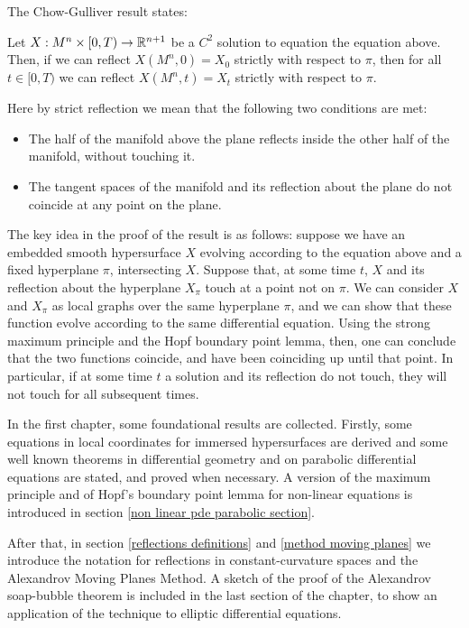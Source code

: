 The Chow-Gulliver result states:

\begin{theorem*}
	Let $X:M^n\times [0,T) \rightarrow \mathbb{R}^{n+1}$ be a $C^2$ solution to equation the equation above. Then, if we can reflect $X(M^n, 0)=X_0$ strictly with respect to $\pi$, then for all $t\in [0,T)$ we can reflect $X(M^n, t)=X_t$ strictly with respect to $\pi$. 
\end{theorem*}

Here by strict reflection we mean that the following two conditions are met: 
\begin{itemize}
	\item The half of the manifold above the plane reflects inside the other half of the manifold, without touching it.
	\item The tangent spaces of the manifold and its reflection about the plane do not coincide at any point on the plane.
\end{itemize}

The key idea in the proof of the result is as follows: suppose we have an embedded smooth hypersurface $X$ evolving according to the equation above and a fixed hyperplane $\pi$, intersecting $X$. Suppose that, at some time $t$, $X$ and  its reflection about the hyperplane $X_\pi$ touch at a point not on $\pi$. We can consider $X$ and  $X_\pi$ as local graphs over the same hyperplane $\pi$, and we can show that these function evolve according to the same differential equation. Using the strong maximum principle and the Hopf boundary point lemma, then, one can conclude that the two functions coincide, and have been coinciding up until that point. In particular, if at some time $t$ a solution and its reflection do not touch, they will not touch for all subsequent times. 

In the first chapter, some foundational results are collected. Firstly, some equations in local coordinates for immersed hypersurfaces are derived and some well known theorems in differential geometry and on parabolic differential equations are stated, and proved when necessary. A version of the maximum principle and of Hopf's boundary point lemma for non-linear equations is introduced in section \ref{non linear pde parabolic section}.

After that, in section \ref{reflections definitions} and 
\ref{method moving planes} we introduce the notation for reflections in constant-curvature spaces and the Alexandrov Moving Planes Method. A sketch of the proof of the Alexandrov soap-bubble theorem is included in the last section of the chapter, to show an application of the technique to elliptic differential equations. 


